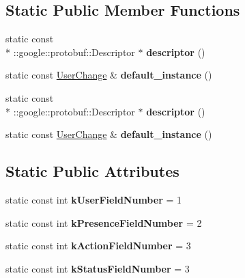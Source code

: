\subsection*{Static Public Member Functions}
\begin{DoxyCompactItemize}
\item 
\hypertarget{classSimpleChat_1_1UserChange_a66c3e83092670c8ee4d22032290a2a06}{static const \\*
\-::google\-::protobuf\-::\-Descriptor $\ast$ {\bfseries descriptor} ()}\label{classSimpleChat_1_1UserChange_a66c3e83092670c8ee4d22032290a2a06}

\item 
\hypertarget{classSimpleChat_1_1UserChange_a76f45a7f32369defc3a5bc848acee2a3}{static const \hyperlink{classSimpleChat_1_1UserChange}{User\-Change} \& {\bfseries default\-\_\-instance} ()}\label{classSimpleChat_1_1UserChange_a76f45a7f32369defc3a5bc848acee2a3}

\item 
\hypertarget{classSimpleChat_1_1UserChange_a66c3e83092670c8ee4d22032290a2a06}{static const \\*
\-::google\-::protobuf\-::\-Descriptor $\ast$ {\bfseries descriptor} ()}\label{classSimpleChat_1_1UserChange_a66c3e83092670c8ee4d22032290a2a06}

\item 
\hypertarget{classSimpleChat_1_1UserChange_a76f45a7f32369defc3a5bc848acee2a3}{static const \hyperlink{classSimpleChat_1_1UserChange}{User\-Change} \& {\bfseries default\-\_\-instance} ()}\label{classSimpleChat_1_1UserChange_a76f45a7f32369defc3a5bc848acee2a3}

\end{DoxyCompactItemize}
\subsection*{Static Public Attributes}
\begin{DoxyCompactItemize}
\item 
\hypertarget{classSimpleChat_1_1UserChange_a0ba1872679138aae71b79fb57081ff6a}{static const int {\bfseries k\-User\-Field\-Number} = 1}\label{classSimpleChat_1_1UserChange_a0ba1872679138aae71b79fb57081ff6a}

\item 
\hypertarget{classSimpleChat_1_1UserChange_a0122d81697bf8c66abc46ad68f21b6b6}{static const int {\bfseries k\-Presence\-Field\-Number} = 2}\label{classSimpleChat_1_1UserChange_a0122d81697bf8c66abc46ad68f21b6b6}

\item 
\hypertarget{classSimpleChat_1_1UserChange_aebcd797fc364ced43fc0e2c8873802b1}{static const int {\bfseries k\-Action\-Field\-Number} = 3}\label{classSimpleChat_1_1UserChange_aebcd797fc364ced43fc0e2c8873802b1}

\item 
\hypertarget{classSimpleChat_1_1UserChange_a0912415ef6f30ed59d7bbf745703f6d4}{static const int {\bfseries k\-Status\-Field\-Number} = 3}\label{classSimpleChat_1_1UserChange_a0912415ef6f30ed59d7bbf745703f6d4}

\end{DoxyCompactItemize}
